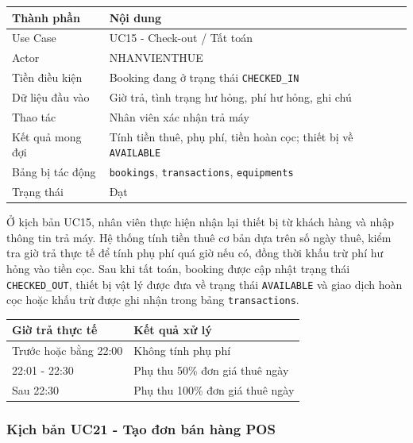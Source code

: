 \begin{table}[H]
	\centering
	\begin{tabularx}{\textwidth}{|l|X|}
		\hline
		\textbf{Thành phần} & \textbf{Nội dung} \\
		\hline
		Use Case & UC15 - Check-out / Tất toán \\
		\hline
		Actor & NHANVIENTHUE \\
		\hline
		Tiền điều kiện & Booking đang ở trạng thái \texttt{CHECKED\_IN} \\
		\hline
		Dữ liệu đầu vào & Giờ trả, tình trạng hư hỏng, phí hư hỏng, ghi chú \\
		\hline
		Thao tác & Nhân viên xác nhận trả máy \\
		\hline
		Kết quả mong đợi & Tính tiền thuê, phụ phí, tiền hoàn cọc; thiết bị về \texttt{AVAILABLE} \\
		\hline
		Bảng bị tác động & \texttt{bookings}, \texttt{transactions}, \texttt{equipments} \\
		\hline
		Trạng thái & Đạt \\
		\hline
	\end{tabularx}
\end{table}

Ở kịch bản UC15, nhân viên thực hiện nhận lại thiết bị từ khách hàng và nhập thông tin trả máy. Hệ thống tính tiền thuê cơ bản dựa trên số ngày thuê, kiểm tra giờ trả thực tế để tính phụ phí quá giờ nếu có, đồng thời khấu trừ phí hư hỏng vào tiền cọc. Sau khi tất toán, booking được cập nhật trạng thái \texttt{CHECKED\_OUT}, thiết bị vật lý được đưa về trạng thái \texttt{AVAILABLE} và giao dịch hoàn cọc hoặc khấu trừ được ghi nhận trong bảng \texttt{transactions}.

\begin{table}[H]
	\centering
	\begin{tabularx}{\textwidth}{|l|X|}
		\hline
		\textbf{Giờ trả thực tế} & \textbf{Kết quả xử lý} \\
		\hline
		Trước hoặc bằng 22:00 & Không tính phụ phí \\
		\hline
		22:01 - 22:30 & Phụ thu 50\% đơn giá thuê ngày \\
		\hline
		Sau 22:30 & Phụ thu 100\% đơn giá thuê ngày \\
		\hline
	\end{tabularx}
\end{table}

\subsubsection{Kịch bản UC21 - Tạo đơn bán hàng POS}

